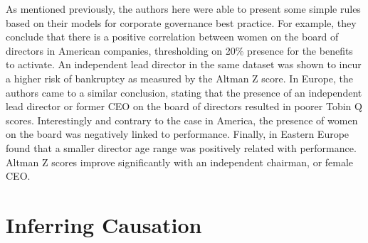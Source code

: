 {As mentioned previously, the authors here were able to present some simple rules based on their models for corporate governance best practice. For example, they conclude that there is a positive correlation between women on the board of directors in American companies, thresholding on 20\% presence for the benefits to activate. An independent lead director in the same dataset was shown to incur a higher risk of bankruptcy as measured by the Altman Z score. In Europe, the authors came to a similar conclusion, stating that the presence of an independent lead director or former CEO on the board of directors resulted in poorer Tobin Q scores. Interestingly and contrary to the case in America, the presence of women on the board was negatively linked to performance. Finally, in Eastern Europe \cite{moldovan2015learning} found that a smaller director age range was positively related with performance. Altman Z scores improve significantly with an independent chairman, or female CEO. 
}
\section{Inferring Causation}

